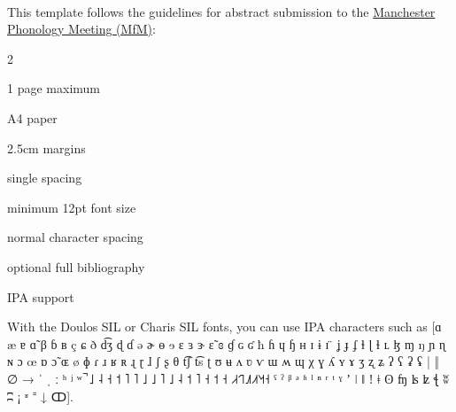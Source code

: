 \documentclass[12pt]{article}
\newenvironment{itemize*}%
  {\begin{itemize}%
    \setlength{\itemsep}{2pt}%
    \setlength{\parskip}{1pt}}%
  {\end{itemize}}
\begin{document}
\thispagestyle{empty}
\begin{center}
    {\bfseries \titleoftheabstract{}}
    \\\vspace{0.16cm}
    \authorsandaffiliations{}
\end{center}\vspace{-0.16cm}





\noindent This template follows the guidelines for abstract submission to the \href{http://www.lel.ed.ac.uk/mfm/mfm.html}{Manchester Phonology Meeting (MfM)}:
\begin{multicols}{2}
    \begin{itemize*}
        \item 1 page maximum
        \item A4 paper
        \item 2.5cm margins
        \item single spacing
        \item minimum 12pt font size
        \item normal character spacing
        \item optional full bibliography
        \item IPA support
    \end{itemize*}
\end{multicols}

\noindent With the Doulos SIL or Charis SIL fonts, you can use IPA characters such as [ɑ æ ɐ ɑ̃ β ɓ ʙ ç ɕ ð d͡ʒ ɖ ɗ ə ɚ ɵ ɘ ɛ ɜ ɝ ɛ̃ ɞ ɠ ɢ ʛ ħ ɦ ɥ ɧ ʜ ɪ ɨ ɪ ̈ ʝ ɟ ʄ ɫ ɭ ɬ ʟ ɮ ɱ ŋ ɲ ɳ ɴ ɔ œ ɒ ɔ̃ ɶ ø ɸ ɾ ɹ ʁ ʀ ɻ ɽ ɺ ʃ ʂ θ t͡ʃ t͡s ʈ ʊ ʉ ʌ ʋ ⱱ ɯ ʍ ɰ χ ɣ ʎ ʏ ɤ ʒ ʐ ʑ ʔ ʕ ʡ ʢ | ‖ ∅ → ˈ ˌ ː ʰ ʲ ʷ ̚ ˩ ˨ ˧ ˦ ˥ ˥ ˩ ˩ ˥ ˩ ˨ ˦ ˥ ˧ ˦ ˧ ˩˨˧˦˥˥˩˩˥˩˨˦˥˧˦˧ ˤ ˀ ᵝ ᵊ ʱ ˡ ⁿ ʳ ᵗ ˠ ʼ ǀ ǁ ǃ ǂ ʘ ʩ ʪ ʫ ꞎ ʬ ʭ ¡ ʶ ⁼ ↓ ↀ].\\
\end{document}
